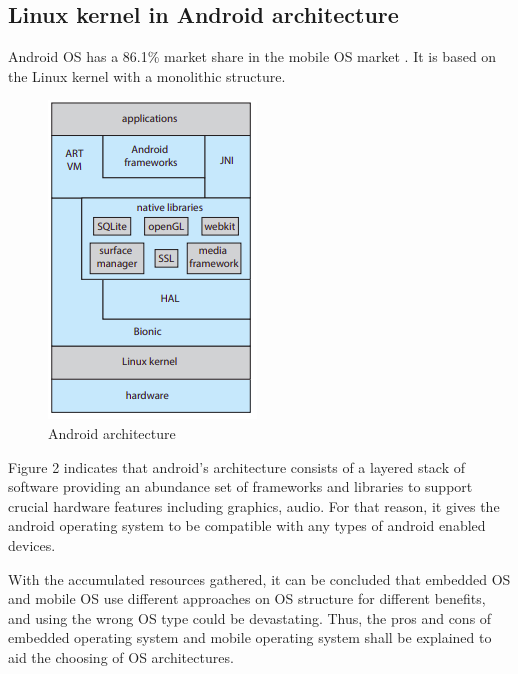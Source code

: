 \documentclass[conference]{IEEEtran}
\newcommand{\forceindent}{\leavevmode{\parindent=1em\indent}}
\begin{document}
\medskip
\subsection{Linux kernel in Android architecture}
\forceindent Android OS has a 86.1\% market share in the mobile OS market \cite{SMS}. It is based on the Linux kernel with a monolithic structure.

\begin{figure}[h]
  \caption{Android architecture}
\begin{center}
\includegraphics[scale=0.7]{./images/Android_architecture.png}
\end{center}
\end{figure}

\smallskip

\smallskip
\forceindent Figure 2 indicates that android’s architecture consists of a layered stack of software providing an abundance set of frameworks and libraries to support crucial hardware features including graphics, audio\cite{Galvinbook}. For that reason, it gives the android operating system to be compatible with any types of android enabled devices.

\smallskip
\forceindent With the accumulated resources gathered, it can be concluded that embedded OS and mobile OS use different approaches on OS structure for different benefits, and using the wrong OS type could be devastating. Thus, the pros and cons of embedded operating system and mobile operating system shall be explained to aid the choosing of OS architectures.
\end{document}
